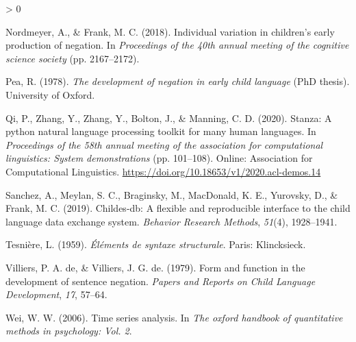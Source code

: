 \documentclass[
  english,
  man,floatsintext]{apa6}
\newlength{\cslhangindent}
\newenvironment{CSLReferences}[2] %
 {%
  \setlength{\parindent}{0pt}
  \ifodd #1 \everypar{\setlength{\hangindent}{\cslhangindent}}\ignorespaces\fi
  \ifnum #2 > 0
  \setlength{\parskip}{#2\baselineskip}
  \fi
 }%
 {}
\begin{document}
\begin{CSLReferences}{1}{0}
\leavevmode\hypertarget{ref-nordmeyer2018individual}{}%
Nordmeyer, A., \& Frank, M. C. (2018). Individual variation in children's early production of negation. In \emph{Proceedings of the 40th annual meeting of the cognitive science society} (pp. 2167--2172).

\leavevmode\hypertarget{ref-pea1978}{}%
Pea, R. (1978). \emph{The development of negation in early child language} (PhD thesis). University of Oxford.

\leavevmode\hypertarget{ref-qi-etal-2020-stanza}{}%
Qi, P., Zhang, Y., Zhang, Y., Bolton, J., \& Manning, C. D. (2020). {S}tanza: A python natural language processing toolkit for many human languages. In \emph{Proceedings of the 58th annual meeting of the association for computational linguistics: System demonstrations} (pp. 101--108). Online: Association for Computational Linguistics. \url{https://doi.org/10.18653/v1/2020.acl-demos.14}

\leavevmode\hypertarget{ref-sanchez2019childes}{}%
Sanchez, A., Meylan, S. C., Braginsky, M., MacDonald, K. E., Yurovsky, D., \& Frank, M. C. (2019). Childes-db: A flexible and reproducible interface to the child language data exchange system. \emph{Behavior Research Methods}, \emph{51}(4), 1928--1941.

\leavevmode\hypertarget{ref-dg}{}%
Tesnière, L. (1959). \emph{{É}l{é}ments de syntaxe structurale}. Paris: Klincksieck.

\leavevmode\hypertarget{ref-de1979form}{}%
Villiers, P. A. de, \& Villiers, J. G. de. (1979). Form and function in the development of sentence negation. \emph{Papers and Reports on Child Language Development}, \emph{17}, 57--64.

\leavevmode\hypertarget{ref-wei2006time}{}%
Wei, W. W. (2006). Time series analysis. In \emph{The oxford handbook of quantitative methods in psychology: Vol. 2}.

\end{CSLReferences}
\end{document}
